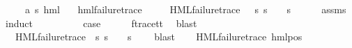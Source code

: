 \begin{isabellebody}
\ \ \ {\isasymphi}\ {\isacharcolon}{\kern0pt}{\isacharcolon}{\kern0pt}\ {\isachardoublequoteopen}{\isacharparenleft}{\kern0pt}{\isacharprime}{\kern0pt}a{\isacharcomma}{\kern0pt}\ {\isacharprime}{\kern0pt}s{\isacharparenright}{\kern0pt}\ hml{\isachardoublequoteclose}\isanewline
\ \ \ {\isachardoublequoteopen}hml{\isacharunderscore}{\kern0pt}failure{\isacharunderscore}{\kern0pt}trace\ {\isasymphi}{\isachardoublequoteclose}\isanewline
\ \ \ {\isachardoublequoteopen}{\isasymexists}{\isasympsi}{\isachardot}{\kern0pt}\ HML{\isacharunderscore}{\kern0pt}failure{\isacharunderscore}{\kern0pt}trace\ {\isasympsi}\ {\isasymand}\ {\isacharparenleft}{\kern0pt}{\isasymforall}s{\isachardot}{\kern0pt}\ {\isacharparenleft}{\kern0pt}s\ {\isasymTurnstile}\ {\isasymphi}{\isacharparenright}{\kern0pt}\ {\isasymlongleftrightarrow}\ {\isacharparenleft}{\kern0pt}s\ {\isasymTurnstile}\ {\isasympsi}{\isacharparenright}{\kern0pt}{\isacharparenright}{\kern0pt}{\isachardoublequoteclose}\isanewline
%
\isadelimproof
\ \ %
\endisadelimproof
%
\isatagproof
{}\isamarkupfalse%
\ assms\ \isamarkupfalse%
\ induct\isanewline
\ \ \isamarkupfalse%
\ {}\isanewline
\ \ \isamarkupfalse%
\ \isamarkupfalse%
\ {\isacharquery}{\kern0pt}case\isanewline
\ \ \ \ \isamarkupfalse%
\ f{\isacharunderscore}{\kern0pt}trace{\isacharunderscore}{\kern0pt}tt\ \isamarkupfalse%
\ blast\isanewline
{}\isamarkupfalse%
\isanewline
\ \ \isamarkupfalse%
\ {\isacharparenleft}{\kern0pt}{}\ {\isasymphi}\ {\isasymalpha}{\isacharparenright}{\kern0pt}\isanewline
\ \ \isamarkupfalse%
\ \isamarkupfalse%
\ {\isasympsi}\ \ {\isachardoublequoteopen}HML{\isacharunderscore}{\kern0pt}failure{\isacharunderscore}{\kern0pt}trace\ {\isasympsi}{\isachardoublequoteclose}\ {\isachardoublequoteopen}{\isacharparenleft}{\kern0pt}{\isasymforall}s{\isachardot}{\kern0pt}\ {\isacharparenleft}{\kern0pt}s\ {\isasymTurnstile}\ {\isasymphi}{\isacharparenright}{\kern0pt}\ {\isacharequal}{\kern0pt}\ {\isacharparenleft}{\kern0pt}s\ {\isasymTurnstile}\ {\isasympsi}{\isacharparenright}{\kern0pt}{\isacharparenright}{\kern0pt}{\isachardoublequoteclose}\ \isamarkupfalse%
\ blast\isanewline
\ \ \isamarkupfalse%
\ {\isachardoublequoteopen}HML{\isacharunderscore}{\kern0pt}failure{\isacharunderscore}{\kern0pt}trace\ {\isacharparenleft}{\kern0pt}hml{\isacharunderscore}{\kern0pt}pos\ {\isasymalpha}\ {\isasympsi}{\isacharparenright}{\kern0pt}{\isachardoublequoteclose}\ \isanewline

\end{isabellebody}
